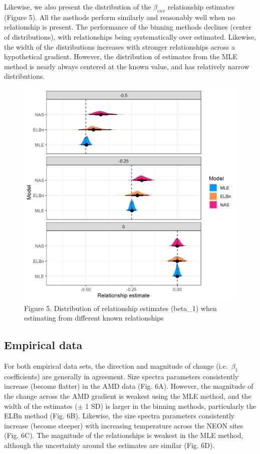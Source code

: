 \documentclass[
]{article}
\begin{document}
Likewise, we also present the distribution of the \(\beta_{env}\)
relationship estimates (Figure 5). All the methods perform similarly and
reasonably well when no relationship is present. The performance of the
binning methods declines (center of distributions), with relationships
being systematically over estimated. Likewise, the width of the
distributions increases with stronger relationships across a
hypothetical gradient. However, the distribution of estimates from the
MLE method is nearly always centered at the known value, and has
relatively narrow distributions.

\begin{figure}
\centering
\includegraphics{figures/vary_beta_density_plot.png}
\caption{Figure 5. Distribution of relationship estimates (beta\_1) when
estimating from different known relationships}
\end{figure}

\hypertarget{empirical-data-1}{%
\subsection{Empirical data}\label{empirical-data-1}}

For both empirical data sets, the direction and magnitude of change
(i.e.~\(\beta_1\) coefficients) are generally in agreement. Size spectra
parameters consistently increase (become flatter) in the AMD data (Fig.
6A). However, the magnitude of the change across the AMD gradient is
weakest using the MLE method, and the width of the estimates (\(\pm\) 1
SD) is larger in the binning methods, particularly the ELBn method (Fig.
6B). Likewise, the size spectra parameters consistently increase (become
steeper) with increasing temperature across the NEON sites (Fig. 6C).
The magnitude of the relationships is weakest in the MLE method,
although the uncertainty around the estimates are similar (Fig. 6D).
\end{document}
